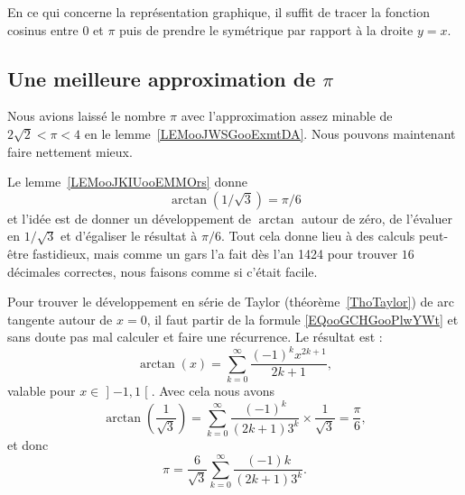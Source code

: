 	En ce qui concerne la représentation graphique, il suffit de tracer la fonction cosinus entre \( 0\) et \( \pi\) puis de prendre le symétrique par rapport à la droite \( y=x\).

	\begin{center}
		
	\end{center}

	\subsection{Une meilleure approximation de \( \pi\)}

	Nous avions laissé le nombre \( \pi\) avec l'approximation assez minable de \( 2\sqrt{ 2 }<\pi<4\) en le lemme~\ref{LEMooJWSGooExmtDA}. Nous pouvons maintenant faire nettement mieux.

	Le lemme~\ref{LEMooJKIUooEMMOrs} donne
	\begin{equation}
		\arctan(1/\sqrt{ 3 })=\pi/6
	\end{equation}
	et l'idée est de donner un développement de \( \arctan\) autour de zéro, de l'évaluer en \( 1/\sqrt{ 3 }\) et d'égaliser le résultat à \( \pi/6\). Tout cela donne lieu à des calculs peut-être fastidieux, mais comme un gars l'a fait dès l'an 1424\cite{ooOMUNooGROVUu} pour trouver \( 16\) décimales correctes, nous faisons comme si c'était facile.

	Pour trouver le développement en série de Taylor (théorème~\ref{ThoTaylor}) de arc tangente autour de \( x=0\), il faut partir de la formule \eqref{EQooGCHGooPlwYWt} et sans doute pas mal calculer et faire une récurrence. Le résultat est :
	\begin{equation}
		\arctan(x)=\sum_{k=0}^{\infty}\frac{ (-1)^{k}x^{2k+1} }{ 2k+1 },
	\end{equation}
	valable pour \( x\in \mathopen] -1 , 1 \mathclose[\). Avec cela nous avons
\begin{equation}
	\arctan(\frac{1}{ \sqrt{ 3 } })=\sum_{k=0}^{\infty}\frac{ (-1)^k }{ (2k+1)3^k }\times \frac{1}{ \sqrt{ 3 } }=\frac{ \pi }{ 6 },
\end{equation}
et donc
\begin{equation}
	\pi=\frac{ 6 }{ \sqrt{ 3 } }\sum_{k=0}^{\infty}\frac{ (-1)k }{ (2k+1)3^k }.
\end{equation}

